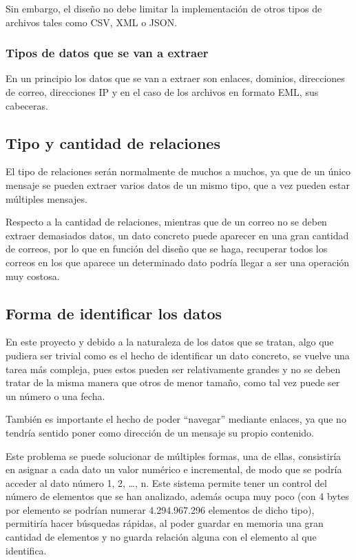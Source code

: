 Sin embargo, el diseño no debe limitar la implementación de otros tipos de archivos tales como CSV, XML o JSON. 

\subsubsection{Tipos de datos que se van a extraer}
En un principio los datos que se van a extraer son enlaces, dominios, direcciones de correo, direcciones IP y en el caso de los archivos en formato EML, sus cabeceras. 

\subsection{Tipo y cantidad de relaciones}
El tipo de relaciones serán normalmente de muchos a muchos, ya que de un único mensaje se pueden extraer varios datos de un mismo tipo, que a vez pueden estar múltiples mensajes.

Respecto a la cantidad de relaciones, mientras que de un correo no se deben extraer demasiados datos, un dato concreto puede aparecer en una gran cantidad de correos, por lo que en función del diseño que se haga, recuperar todos los correos en los que aparece un determinado dato podría llegar a ser una operación muy costosa. 

\subsection{Forma de identificar los datos}
En este proyecto y debido a la naturaleza de los datos que se tratan, algo que pudiera ser trivial como es el hecho de identificar un dato concreto, se vuelve una tarea más compleja, pues estos pueden ser relativamente grandes y no se deben tratar de la misma manera que otros de menor tamaño, como tal vez puede ser un número o una fecha. 

También es importante el hecho de poder “navegar” mediante enlaces, ya que no tendría sentido poner como dirección de un mensaje su propio contenido.

Este problema se puede solucionar de múltiples formas, una de ellas, consistiría en asignar a cada dato un valor numérico e incremental, de modo que se podría acceder al dato número 1, 2, …, n. Este sistema permite tener un control del número de elementos que se han analizado, además ocupa muy poco (con 4 bytes por elemento se podrían numerar 4.294.967.296 elementos de dicho tipo), permitiría hacer búsquedas rápidas, al poder guardar en memoria una gran cantidad de elementos y no guarda relación alguna con el elemento al que identifica.

